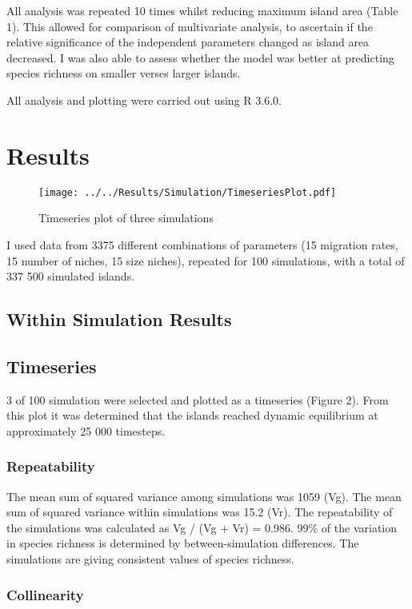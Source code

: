 \documentclass{article}
\begin{document}
All analysis was repeated 10 times whilst reducing maximum island area (Table 1). This allowed for comparison of multivariate analysis, to ascertain if the relative significance of the independent parameters changed as island area decreased. I was also able to assess whether the model was better at predicting species richness on smaller verses larger islands.

All analysis and plotting were carried out using R 3.6.0.


\section{Results}

\begin{figure}[!h]
\centering
  \texttt{[image: ../../Results/Simulation/TimeseriesPlot.pdf]}
  \caption{Timeseries plot of three simulations}
  \label{fig:Timeseries plot}
\end{figure}

I used data from 3375 different combinations of parameters (15 migration rates, 15 number of niches, 15 size niches), repeated for 100 simulations, with a total of 337 500 simulated islands. 

\subsection{Within Simulation Results}

\subsection{Timeseries}
3 of 100 simulation were selected and plotted as a timeseries (Figure 2). From this plot it was determined that the islands reached dynamic equilibrium at approximately 25 000 timesteps. 

\subsubsection{Repeatability} %
The mean sum of squared variance among simulations was 1059 (Vg). The mean sum of squared variance within simulations was 15.2 (Vr). The repeatability of the simulations was calculated as Vg / (Vg + Vr)  = 0.986. 99\% of the variation in species richness is determined by between-simulation differences. The simulations are giving consistent values of species richness. 

\subsubsection{Collinearity}
\end{document}

